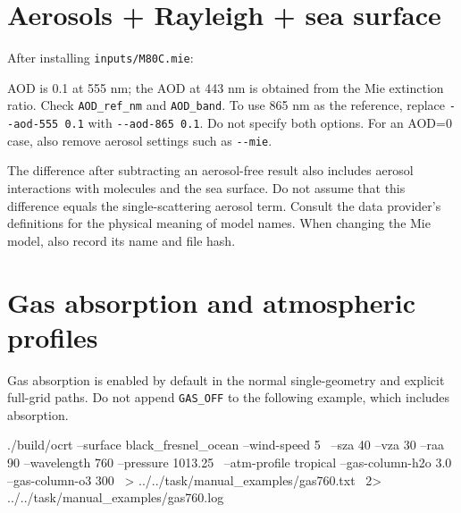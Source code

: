 \section{Aerosols + Rayleigh + sea surface}
\label{sec:auto:04_examples:5}
After installing \texttt{inputs/\allowbreak{}M80C.\allowbreak{}mie}:


\par\noindent\begin{minipage}{\linewidth}
\end{minipage}\par

AOD is 0.1 at 555 nm; the AOD at 443 nm is obtained from the Mie extinction ratio. Check \texttt{AOD\_\allowbreak{}ref\_\allowbreak{}nm} and \texttt{AOD\_\allowbreak{}band}. To use 865 nm as the reference, replace \texttt{-\allowbreak{}-\allowbreak{}aod-\allowbreak{}555 0.\allowbreak{}1} with \texttt{-\allowbreak{}-\allowbreak{}aod-\allowbreak{}865 0.\allowbreak{}1}. Do not specify both options. For an AOD=0 case, also remove aerosol settings such as \texttt{-\allowbreak{}-\allowbreak{}mie}.

The difference after subtracting an aerosol-free result also includes aerosol interactions with molecules and the sea surface. Do not assume that this difference equals the single-scattering aerosol term. Consult the data provider's definitions for the physical meaning of model names. When changing the Mie model, also record its name and file hash.

\section{Gas absorption and atmospheric profiles}
\label{sec:auto:04_examples:6}
Gas absorption is enabled by default in the normal single-geometry and explicit full-grid paths. Do not append \texttt{GAS\_\allowbreak{}OFF} to the following example, which includes absorption.


\par\noindent\begin{minipage}{\linewidth}
\begin{ManualCode}
./build/ocrt --surface black_fresnel_ocean --wind-speed 5 \
  --sza 40 --vza 30 --raa 90 --wavelength 760 --pressure 1013.25 \
  --atm-profile tropical --gas-column-h2o 3.0 --gas-column-o3 300 \
  > ../../task/manual_examples/gas760.txt \
  2> ../../task/manual_examples/gas760.log
\end{ManualCode}
\end{minipage}\par

